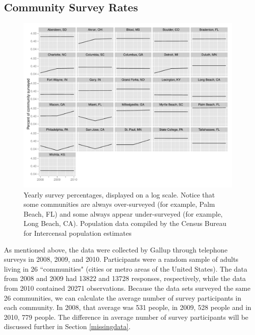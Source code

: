 \documentclass[smallextended]{svjour3}\usepackage[]{graphicx}\usepackage[]{color}
\newenvironment{knitrout}{}{} %
\begin{document}
\subsection{Community Survey Rates}
\label{maprates}



\begin{knitrout}
\color{fgcolor}\begin{figure}

\includegraphics[width=0.99\linewidth]{figure/surveyrates-1} \hfill{}

\caption[Yearly survey percentages, displayed on a log scale]{Yearly survey percentages, displayed on a log scale. Notice that some communities are always over-surveyed (for example, Palm Beach, FL) and some always appear under-surveyed (for example, Long Beach, CA). Population data compiled by the Census Bureau for Intercensal population estimates}\label{fig:surveyrates}
\end{figure}


\end{knitrout}
As mentioned above, the data were collected by Gallup through telephone surveys in 2008, 2009, and 2010. Participants were a random sample of adults living in 26 ``communities" (cities or metro areas of the United States). The data from 2008 and 2009 had 13822 and 13728 responses, respectively, while the data from 2010 contained 20271 observations. Because the data sets surveyed the same 26 communities, we can calculate the average number of survey participants in each community. In 2008, that average was 531 people, in 2009, 528 people and in 2010, 779 people. The difference in average number of survey participants will be discussed further in Section \ref{missingdata}. 
\end{document}
